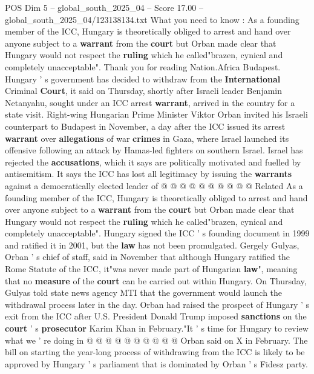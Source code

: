 \begin{textsample}{POS Dim 5 – global\_south\_2025\_04 – Score 17.00 – global\_south\_2025\_04/123138134.txt}  \label{ex:f5_pos_065}
What you need to know : As a founding member of the ICC, Hungary is theoretically obliged to arrest and hand over anyone subject to a \textbf{warrant} from the \textbf{court} but Orban made clear that Hungary would not respect the \textbf{ruling} which he called"brazen, cynical and completely unacceptable".
Thank you for reading Nation.Africa Budapest.
Hungary ' s government has decided to withdraw from the \textbf{International} Criminal \textbf{Court}, it said on Thursday, shortly after Israeli leader Benjamin Netanyahu, sought under an ICC arrest \textbf{warrant}, arrived in the country for a state visit.
Right-wing Hungarian Prime Minister Viktor Orban invited his Israeli counterpart to Budapest in November, a day after the ICC issued its arrest \textbf{warrant} over \textbf{allegations} of war \textbf{crimes} in Gaza, where Israel launched its offensive following an attack by Hamas-led fighters on southern Israel.
Israel has rejected the \textbf{accusations}, which it says are politically motivated and fuelled by antisemitism.
It says the ICC has lost all legitimacy by issuing the \textbf{warrants} against a democratically elected leader of @ @ @ @ @ @ @ @ @ @ Related As a founding member of the ICC, Hungary is theoretically obliged to arrest and hand over anyone subject to a \textbf{warrant} from the \textbf{court} but Orban made clear that Hungary would not respect the \textbf{ruling} which he called"brazen, cynical and completely unacceptable".
Hungary signed the ICC ' s founding document in 1999 and ratified it in 2001, but the \textbf{law} has not been promulgated.
Gergely Gulyas, Orban ' s chief of staff, said in November that although Hungary ratified the Rome Statute of the ICC, it"was never made part of Hungarian \textbf{law}", meaning that no \textbf{measure} of the \textbf{court} can be carried out within Hungary.
On Thursday, Gulyas told state news agency MTI that the government would launch the withdrawal process later in the day.
Orban had raised the prospect of Hungary ' s exit from the ICC after U.S.
President Donald Trump imposed \textbf{sanctions} on the \textbf{court} ' s \textbf{prosecutor} Karim Khan in February."It ' s time for Hungary to review what we ' re doing in @ @ @ @ @ @ @ @ @ @ Orban said on X in February.
The bill on starting the year-long process of withdrawing from the ICC is likely to be approved by Hungary ' s parliament that is dominated by Orban ' s Fidesz party.

\end{textsample}
